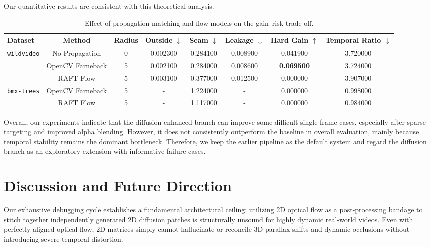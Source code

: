 \documentclass[10pt,twocolumn,letterpaper]{article}
\begin{document}
Our quantitative results are consistent with this theoretical analysis.

\begin{table}[t]
\centering
\small
\setlength{\tabcolsep}{4pt}
\caption{Effect of propagation matching and flow models on the gain--risk trade-off.}
\label{tab:flow_failure}
\begin{tabular}{lccccccc}
\toprule
Dataset & Method & Radius & Outside $\downarrow$ & Seam $\downarrow$ & Leakage $\downarrow$ & Hard Gain $\uparrow$ & Temporal Ratio $\downarrow$ \\
\midrule
\multirow{3}{*}{\texttt{wildvideo}} & No Propagation     & 0 & 0.002300 & 0.284100 & 0.008900 & 0.041900 & 3.720000 \\
                                    & OpenCV Farneback   & 5 & 0.002100 & 0.284000 & 0.008600 & \textbf{0.069500} & 3.724000 \\
                                    & RAFT Flow          & 5 & 0.003100 & 0.377000 & 0.012500 & 0.000000 & 3.907000 \\
\midrule
\multirow{2}{*}{\texttt{bmx-trees}} & OpenCV Farneback   & 5 & -        & 1.224000 & -        & 0.000000 & 0.998000 \\
                                    & RAFT Flow          & 5 & -        & 1.117000 & -        & 0.000000 & 0.984000 \\
\bottomrule
\end{tabular}
\end{table}

Overall, our experiments indicate that the diffusion-enhanced branch can improve some difficult single-frame cases, especially after sparse targeting and improved alpha blending.
However, it does not consistently outperform the baseline in overall evaluation, mainly because temporal stability remains the dominant bottleneck.
Therefore, we keep the earlier pipeline as the default system and regard the diffusion branch as an exploratory extension with informative failure cases.

\section{Discussion and Future Direction}

Our exhaustive debugging cycle establishes a fundamental architectural ceiling: utilizing 2D optical flow as a post-processing bandage to stitch together independently generated 2D diffusion patches is structurally unsound for highly dynamic real-world videos. Even with perfectly aligned optical flow, 2D matrices simply cannot hallucinate or reconcile 3D parallax shifts and dynamic occlusions without introducing severe temporal distortion.
\end{document}

